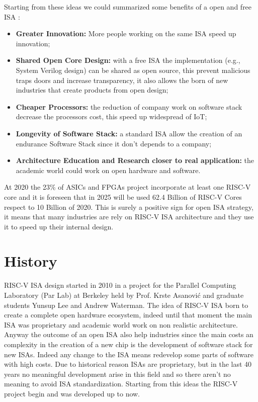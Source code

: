{    Starting from these ideas we could summarized some benefits of a open and free ISA  :
    \begin{itemize}
        \item \textbf{Greater Innovation:} More people working on the same ISA speed up innovation;
        \item \textbf{Shared Open Core Design:} with a free ISA the implementation (e.g., System Verilog design) can be shared as open source, this prevent malicious traps doors and increase transparency, it also allows the born of new industries that create products from open design;
        \item \textbf{Cheaper Processors:} the reduction of company work on software stack decrease the processors cost, this speed up widespread of IoT;
        \item \textbf{Longevity of Software Stack:} a standard ISA allow the creation of an endurance Software Stack since it don't depends to a company;
        \item \textbf{Architecture Education and Research closer to real application: } the academic world could work on open hardware and software.
    \end{itemize}
    
    At 2020 the 23\% of ASICs and FPGAs project incorporate at least one RISC-V core and it is foreseen that in 2025 will be used 62.4 Billion of RISC-V Cores respect to 10 Billion of 2020.
    This is surely a positive sign for open ISA strategy, it means that many industries are rely on RISC-V ISA architecture and they use it to speed up their internal design.
    
	
	\section{History}{
	    RISC-V ISA design started in 2010 in a project for the Parallel Computing Laboratory (Par Lab) at Berkeley held by Prof. Krste Asanović and graduate students Yunsup Lee and Andrew Waterman.
	    The idea of RISC-V ISA born to create a complete open hardware ecosystem, indeed until that moment the main ISA was proprietary and academic world work on non realistic architecture.
	    Anyway the outcome of an open ISA also help industries since the main costs an complexity in the creation of a new chip is the development of software stack for new ISAs.
	    Indeed any change to the ISA means redevelop some parts of software with high costs.
	    Due to historical reason ISAs are proprietary, but in the last 40 years no meaningful development arise in this field and so there aren't no meaning to avoid ISA standardization. 
	    Starting from this ideas the RISC-V project begin and was developed up to now.\\
	    
}}
